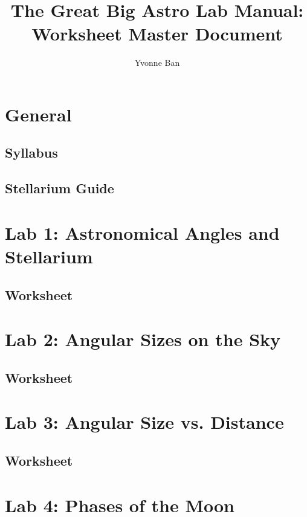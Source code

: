 \documentclass[12pt]{article}
\title{The Great Big Astro Lab Manual:\\Worksheet Master Document}
\author{Yvonne Ban}
\begin{document}
\begin{titlepage}
\maketitle
\end{titlepage}

\section{General}

\subsection{Syllabus}

\subsection{Stellarium Guide}
%
\newpage

\section{Lab 1: Astronomical Angles and Stellarium}
\subsection{Worksheet}

\newpage

\section{Lab 2: Angular Sizes on the Sky}
\subsection{Worksheet}
%
\newpage

\section{Lab 3: Angular Size vs. Distance}
\subsection{Worksheet}

\newpage

\section{Lab 4: Phases of the Moon}
\end{document}
